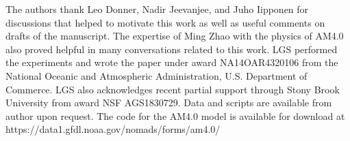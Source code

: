 \documentclass[draft]{agujournal2019}
\begin{document}
{%
%
%
%
\acknowledgments
The authors thank Leo Donner, Nadir Jeevanjee, and Juho Iipponen for discussions  that helped to motivate this work as well as useful comments on drafts of the manuscript.  The expertise of Ming Zhao with the physics of AM4.0 also proved helpful in many conversations related to this work.  LGS performed the experiments and wrote the paper under award NA14OAR4320106 from the National Oceanic and Atmospheric Administration, U.S. Department of Commerce.  LGS also acknowledges recent partial support through Stony Brook University from award NSF AGS1830729.  Data and scripts are available from author upon request.  The code for the AM4.0 model is available for download at  https://data1.gfdl.noaa.gov/nomads/forms/am4.0/ 

}
\end{document}
